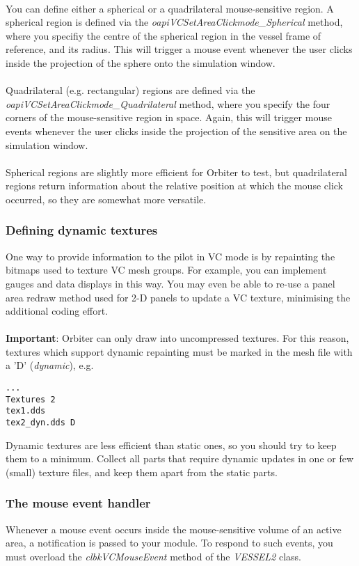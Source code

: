 \documentclass[Orbiter Developer Manual.tex]{subfiles}
\begin{document}
\\
You can define either a spherical or a quadrilateral mouse-sensitive region. A spherical region is defined via the \textit{oapiVCSetAreaClickmode\_Spherical} method, where you specifiy the centre of the spherical region in the vessel frame of reference, and its radius. This will trigger a mouse event whenever the user clicks inside the projection of the sphere onto the simulation window.\\
\\
Quadrilateral (e.g. rectangular) regions are defined via the \textit{oapiVCSetAreaClickmode\_Quadrilateral} method, where you specify the four corners of the mouse-sensitive region in space. Again, this will trigger mouse events whenever the user clicks inside the projection of the sensitive area on the simulation window.\\
\\
Spherical regions are slightly more efficient for Orbiter to test, but quadrilateral regions return information about the relative position at which the mouse click occurred, so they are somewhat more versatile.


\subsubsection{Defining dynamic textures}
One way to provide information to the pilot in VC mode is by repainting the bitmaps used to texture VC mesh groups. For example, you can implement gauges and data displays in this way. You may even be able to re-use a panel area redraw method used for 2-D panels to update a VC texture, minimising the additional coding effort.\\
\\
\textbf{Important}: Orbiter can only draw into uncompressed textures. For this reason, textures which support dynamic repainting must be marked in the mesh file with a 'D' (\textit{dynamic}), e.g.

\begin{lstlisting}
...
Textures 2
tex1.dds
tex2_dyn.dds D
\end{lstlisting}

\noindent
Dynamic textures are less efficient than static ones, so you should try to keep them to a minimum. Collect all parts that require dynamic updates in one or few (small) texture files, and keep them apart from the static parts.


\subsubsection{The mouse event handler}
Whenever a mouse event occurs inside the mouse-sensitive volume of an active area, a notification is passed to your module. To respond to such events, you must overload the \textit{clbkVCMouseEvent} method of the \textit{VESSEL2} class.
\end{document}
